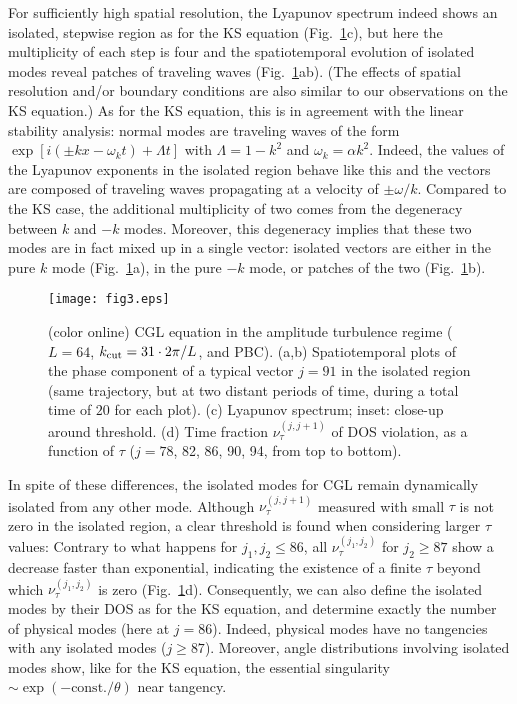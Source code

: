 \documentclass[prl,twocolumn,twoside,showpacs,superscriptaddress]{revtex4}
\begin{document}
For sufficiently high spatial resolution,
 the Lyapunov spectrum indeed shows an isolated, 
stepwise region as for the KS equation (Fig.\ \ref{fig:CGLVarious}c),
 but here the multiplicity of each step is four and the 
spatiotemporal evolution of isolated modes reveal patches of traveling waves
(Fig.\ \ref{fig:CGLVarious}ab). (The effects of spatial resolution
and/or boundary conditions are also similar to our observations on the KS 
equation.)
As for the KS equation, this is in agreement with 
the linear stability analysis:
normal modes are traveling waves
 of the form $\exp[i(\pm kx-\omega_k t) + \Lambda t]$
 with $\Lambda = 1-k^2$ and $\omega_k = \alpha k^2$.
Indeed, the values of the Lyapunov exponents in the isolated region behave
like this
 and the vectors are composed of traveling waves
propagating at a velocity of $\pm \omega/k$. Compared to the KS case,
the additional multiplicity of two comes from the degeneracy
 between $k$ and $-k$ modes.
Moreover, this degeneracy implies that
 these two modes are in fact mixed up in a single vector:
 isolated vectors are either in the pure $k$ mode
(Fig.\ \ref{fig:CGLVarious}a),
 in the pure $-k$ mode, or patches of the two
(Fig.\ \ref{fig:CGLVarious}b).

\begin{figure}[t]
 \begin{center}
  \texttt{[image: fig3.eps]}
  \caption{(color online)
CGL equation in the amplitude turbulence regime 
($L = 64$, $k_{\rm cut} = 31 \cdot 2\pi/L$, and PBC). 
(a,b) Spatiotemporal plots of the phase component of a typical vector $j = 91$ in the isolated region
(same trajectory, but at two distant periods of time, during a total time of $20$ for each plot).
(c) Lyapunov spectrum; inset: close-up around threshold.
(d) Time fraction $\nu^{(j,j+1)}_\tau$ of DOS violation, as a function of $\tau$
($j=78$, 82, 86, 90, 94, from top to bottom).}
  \label{fig:CGLVarious}
 \end{center}
\end{figure}%

In spite of these differences, 
the isolated modes for CGL remain dynamically isolated
 from any other mode.
Although $\nu^{(j,j+1)}_\tau$ measured with small $\tau$ is not zero
 in the isolated region,
 a clear threshold is found when considering larger $\tau$ values:
Contrary to what happens for $j_1,j_2 \leq 86$, all $\nu^{(j_1,j_2)}_\tau$
 for $j_2 \geq 87$ show a decrease faster than exponential,
 indicating the existence of a finite $\tau$ beyond which
 $\nu^{(j_1,j_2)}_\tau$ is zero (Fig.\ \ref{fig:CGLVarious}d).
Consequently, we can also define the isolated modes by their DOS 
as for the KS equation, and determine exactly the number of physical modes
(here at $j=86$). Indeed, physical modes have 
no tangencies with any isolated modes ($j\ge 87$). Moreover,
 angle distributions involving isolated modes show, like for the KS equation,
the essential singularity $\sim \exp(-\text{const.}/\theta)$ near tangency.
\end{document}
